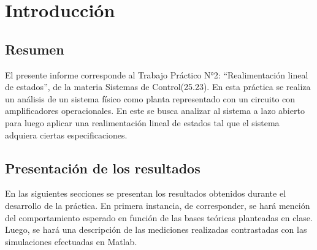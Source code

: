 \section{Introducción}

\subsection{Resumen}
El presente informe corresponde al Trabajo Práctico N°2: ``Realimentación lineal de estados'', de la materia Sistemas de Control(25.23). En esta práctica se realiza un análisis de un sistema físico como planta representado con un circuito con amplificadores operacionales. En este se busca analizar al sistema a lazo abierto para luego aplicar una realimentación lineal de estados tal que el sistema adquiera ciertas especificaciones. 

\subsection{Presentación de los resultados}
En las siguientes secciones se presentan los resultados obtenidos durante el desarrollo de la práctica. En primera instancia, de corresponder, se hará mención del comportamiento esperado en función de las bases teóricas planteadas en clase. Luego, se hará una descripción de las mediciones realizadas contrastadas con las simulaciones efectuadas en Matlab. 

